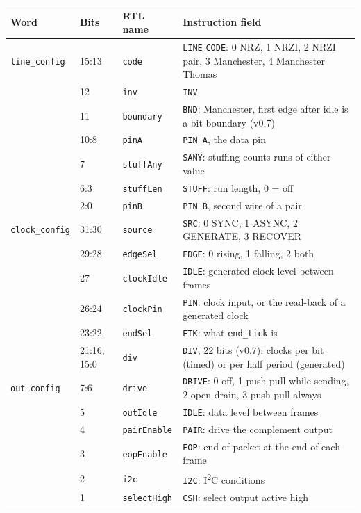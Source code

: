 \documentclass[11pt,a4paper]{article}
\newcommand{\sig}[1]{\texttt{#1}}
\begin{document}
\begin{center}\small
\begin{tabularx}{\linewidth}{@{}l l l L@{}}
\toprule
Word & Bits & RTL name & Instruction field \\
\midrule
\sig{line\_config} & 15:13 & \sig{code} & \sig{LINE} \sig{CODE}: 0 NRZ, 1 NRZI, 2 NRZI pair, 3 Manchester, 4 Manchester Thomas \\
 & 12 & \sig{inv} & \sig{INV} \\
 & 11 & \sig{boundary} & \sig{BND}: Manchester, first edge after idle is a bit boundary (v0.7) \\
 & 10:8 & \sig{pinA} & \sig{PIN\_A}, the data pin \\
 & 7 & \sig{stuffAny} & \sig{SANY}: stuffing counts runs of either value \\
 & 6:3 & \sig{stuffLen} & \sig{STUFF}: run length, 0 = off \\
 & 2:0 & \sig{pinB} & \sig{PIN\_B}, second wire of a pair \\
\midrule
\sig{clock\_config} & 31:30 & \sig{source} & \sig{SRC}: 0 SYNC, 1 ASYNC, 2 GENERATE, 3 RECOVER \\
 & 29:28 & \sig{edgeSel} & \sig{EDGE}: 0 rising, 1 falling, 2 both \\
 & 27 & \sig{clockIdle} & \sig{IDLE}: generated clock level between frames \\
 & 26:24 & \sig{clockPin} & \sig{PIN}: clock input, or the read-back of a generated clock \\
 & 23:22 & \sig{endSel} & \sig{ETK}: what \sig{end\_tick} is \\
 & 21:16, 15:0 & \sig{div} & \sig{DIV}, 22 bits (v0.7): clocks per bit (timed) or per half period (generated) \\
\midrule
\sig{out\_config} & 7:6 & \sig{drive} & \sig{DRIVE}: 0 off, 1 push-pull while sending, 2 open drain, 3 push-pull always \\
 & 5 & \sig{outIdle} & \sig{IDLE}: data level between frames \\
 & 4 & \sig{pairEnable} & \sig{PAIR}: drive the complement output \\
 & 3 & \sig{eopEnable} & \sig{EOP}: end of packet at the end of each frame \\
 & 2 & \sig{i2c} & \sig{I2C}: I\textsuperscript{2}C conditions \\
 & 1 & \sig{selectHigh} & \sig{CSH}: select output active high \\
\bottomrule
\end{tabularx}
\end{center}
\end{document}
